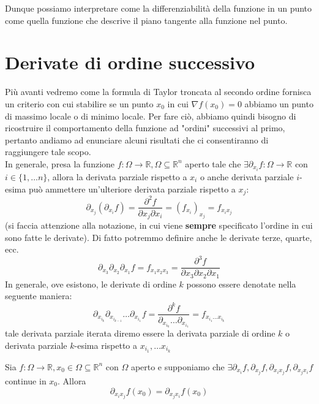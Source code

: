 Dunque possiamo interpretare come la differenziabilità della funzione in un punto come quella funzione che descrive il piano tangente alla funzione nel punto.

\vspace{0.5cm}
\section{Derivate di ordine successivo}
Più avanti vedremo come la formula di Taylor troncata al secondo ordine fornisca un criterio con cui stabilire se un punto $x_0$ in cui $\nabla f(x_0) = 0$ abbiamo un punto di massimo locale o di minimo locale. Per fare ciò, abbiamo quindi bisogno di ricostruire il comportamento della funzione ad "ordini" successivi al primo, pertanto andiamo ad enunciare alcuni
risultati che ci consentiranno di raggiungere tale scopo. \\
In generale, presa la funzione $f: \Omega \to \mathbb{R}, \Omega \subseteq \mathbb{R}^n$ aperto tale che $\exists \partial_{x_i}f: \Omega \to \mathbb{R}$ con $i \in \{ 1, \ldots n \}$, allora la derivata parziale rispetto a $x_i$ o anche derivata parziale $i$-esima può ammettere un'ulteriore derivata parziale rispetto a $x_j$:
$$
\partial_{x_j}(\partial_{x_i} f) = \frac{\partial^2 f}{\partial x_j \partial x_i} = (f_{x_i})_{x_j} = f_{x_i x_j}
$$
(si faccia attenzione alla notazione, in cui viene \textbf{sempre} specificato l'ordine in cui sono fatte le derivate). Di fatto potremmo definire anche le derivate terze, quarte, ecc.
$$
\partial_{x_3} \partial_{x_2} \partial_{x_1} f = f_{x_1 x_2 x_3} = \frac{\partial^3 f}{\partial x_3 \partial x_2 \partial x_1}
$$
In generale, ove esistono, le derivate di ordine $k$ possono essere denotate nella seguente maniera:
$$
\partial_{x_{i_k}} \partial_{x_{i_{k-1}}} \ldots \partial_{x_{i_1}} f = \frac{\partial^k f}{\partial_{x_{i_k}} \ldots \partial_{x_{i_1}}} = f_{x_{i_1} \ldots x_{i_k}}
$$
tale derivata parziale iterata diremo essere la derivata parziale di ordine $k$ o derivata parziale $k$-esima rispetto a $x_{i_1}, \ldots x_{i_k}$

\vspace{0.5cm}
\begin{theorem}[\textcolor{blue}{di Schwarz}]
Sia $f:\Omega \to \mathbb{R}, x_0 \in \Omega \subseteq \mathbb{R}^n$ con $\Omega$ aperto e supponiamo che $\exists \partial_{x_i} f, \partial_{x_j} f, \partial_{x_i x_j} f, \partial_{x_j x_i} f$ continue in $x_0$. Allora
$$
\partial_{x_i x_j} f(x_0) = \partial_{x_j x_i} f(x_0)
$$
\end{theorem}

